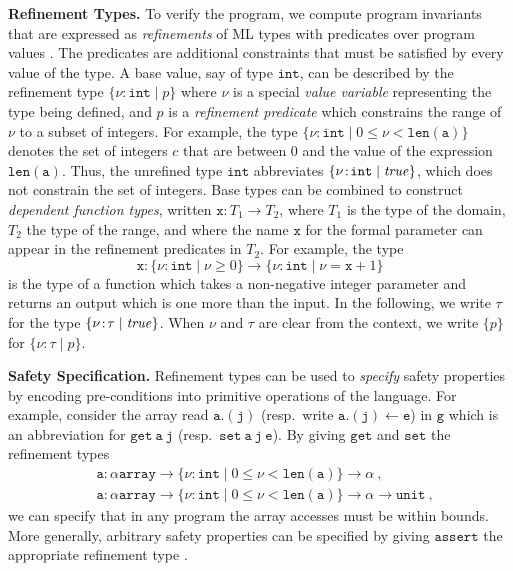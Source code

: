 \documentclass[nocopyrightspace]{sigplanconf}
\def\mypara#1{\smallskip\noindent\textbf{#1}}
\def\set#1{{\{ #1\}}}
\newcommand\ML{\textsc{ML}\xspace}
\def\true{{\it true}}
\newcommand{\ttg}{\mathtt{g}}
\newcommand{\ttx}{\mathtt{x}}
\newcommand{\tta}{\mathtt{a}}
\newcommand{\ttj}{\mathtt{j}}
\newcommand{\ttget}{\mathtt{get}}
\newcommand{\ttset}{\mathtt{set}}
\newcommand{\ttassert}{\mathtt{assert}}
\def\tte{\mathtt{e}}
\newcommand{\ttlena}{{\ttlen}\xspace}
\def\valu{\nu}
\newcommand{\ftyp}[2]{{{#1}\!:\!{#2}}}
\newcommand{\ttarray}{\xspace \mathtt{array}}
\def\ttint{\mathtt{int}}
\newcommand{\typ}{\tau}
\newcommand{\tliqs}{T}
\newcommand{\ttunit}{\mathtt{unit}}
\newcommand{\reftyp}[3]{\set{\ftyp{{#1}}{{#2}} \mid {#3}}}
\newcommand{\sreftyp}[1]{\set{{#1}}}
\newcommand{\ttlen}{\mathtt{len}}
\begin{document}
\mypara{Refinement Types.} 
To verify the program, we compute program invariants that are expressed 
as \emph{refinements} of \ML types with predicates over program 
values \cite{Knowles07,GordonRefinement09,LiquidPLDI08}.
The predicates are additional constraints that must be satisfied by 
every value of the type. A base value, say of type $\ttint$, 
can be described by the refinement type
$\reftyp{\valu}{\ttint}{p}$ 
where $\valu$ is a special \emph{value variable} representing the type
being defined, and $p$ is a \emph{refinement predicate} which constrains 
the range of $\valu$ to a subset of integers.
For example, the type 
$\reftyp{\valu}{\ttint}{0 \leq \valu < \ttlena(\tta)}$ 
denotes the set of integers $c$ that are between $0$ and the 
value of the expression $\ttlena(\tta)$.
Thus, the unrefined type $\ttint$ abbreviates $\reftyp{\valu}{\ttint}{\true}$, 
which does not constrain the set of integers.
Base types can be combined to construct \emph{dependent function types}, 
written $\ftyp{\ttx}{\tliqs_1} \rightarrow \tliqs_2$,
where $\tliqs_1$ is the type of the domain, 
$\tliqs_2$ the type of the range, 
and where the name $\ttx$ for the 
formal parameter can appear in the refinement predicates 
in $\tliqs_2$.
For example, the type 
$$\ftyp{\ttx}{\reftyp{\valu}{\ttint}{\valu\geq 0}} \rightarrow \reftyp{\valu}{\ttint}{\valu = \ttx+1}$$ 
is the type of a function which takes a non-negative integer parameter and returns an 
output which is one more than the input.
In the following, we write $\typ$ for the type $\reftyp{\valu}{\typ}{\true}$.
When $\valu$ and $\typ$ are clear from the context, we write
$\sreftyp{p}$ for $\reftyp{\valu}{\typ}{p}$.

\mypara{Safety Specification.}
Refinement types can be used to \emph{specify} safety properties by 
encoding pre-conditions into primitive operations of the language.
For example, consider the array read $\mathtt{\tta.(\ttj)}$ (resp.\
write $\mathtt{\tta.(\ttj) \leftarrow \tte}$) in $\ttg$ which is an
abbreviation for ${\ttget\ \tta\ \ttj}$ (resp.\ ${\ttset\ \tta\ \ttj\
\tte}$).
By giving $\ttget$ and $\ttset$ the refinement types
\begin{align*}
& \ftyp{\tta}{\alpha \ttarray} \rightarrow 
{\reftyp{\valu}{\ttint}{0 \leq \valu < \ttlena(\tta)}} \rightarrow 
\alpha\ , \\
& \ftyp{\tta}{\alpha \ttarray} \rightarrow
{\reftyp{\valu}{\ttint}{0 \leq \valu < \ttlena(\tta)}} \rightarrow
\alpha \rightarrow 
\ttunit\ ,
\end{align*}
we can specify that in any program the array accesses must be within
bounds. More generally, arbitrary safety properties can be specified 
by giving $\ttassert$ the appropriate refinement type \cite{LiquidPLDI08}.
\end{document}
